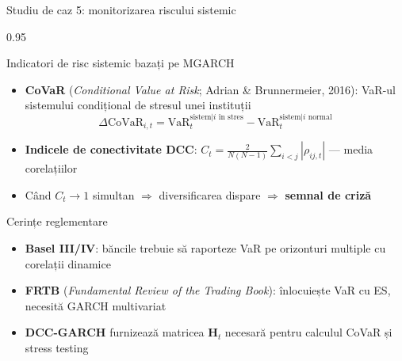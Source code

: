 \documentclass[9pt, aspectratio=169, t]{beamer}
\begin{document}
\begin{frame}{Studiu de caz 5: monitorizarea riscului sistemic}
    \begin{cminipage}{0.95\textwidth}
    {\footnotesize
    \begin{block}{Indicatori de risc sistemic bazați pe MGARCH}
        \begin{itemize}\setlength{\itemsep}{0pt}
            \item \textbf{CoVaR} (\textit{Conditional Value at Risk}; Adrian \& Brunnermeier, 2016): VaR-ul sistemului condițional de stresul unei instituții
            \[
                \Delta\text{CoVaR}_{i,t} = \text{VaR}_{t}^{\text{sistem} | i \text{ în stres}} - \text{VaR}_{t}^{\text{sistem} | i \text{ normal}}
            \]
            \item \textbf{Indicele de conectivitate DCC}: $C_t = \frac{2}{N(N-1)}\sum_{i<j}|\rho_{ij,t}|$ --- media corelațiilor
            \item Când $C_t \rightarrow 1$ simultan $\Rightarrow$ diversificarea dispare $\Rightarrow$ \textbf{semnal de criză}
        \end{itemize}
    \end{block}
    \begin{alertblock}{Cerințe reglementare}
        \begin{itemize}\setlength{\itemsep}{0pt}
            \item \textbf{Basel III/IV}: băncile trebuie să raporteze VaR pe orizonturi multiple cu corelații dinamice
            \item \textbf{FRTB} (\textit{Fundamental Review of the Trading Book}): înlocuiește VaR cu ES, necesită GARCH multivariat
            \item \textbf{DCC-GARCH} furnizează matricea $\mathbf{H}_t$ necesară pentru calculul CoVaR și stress testing
        \end{itemize}
    \end{alertblock}
    }
    \end{cminipage}
\end{frame}
\end{document}
